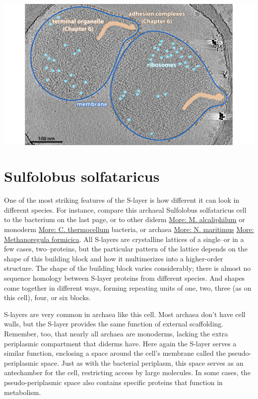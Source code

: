 \documentclass[]{tufte-book}
\begin{document}
\includegraphics{img/02_static/2_1_Mgenitalium}

\section{Sulfolobus solfataricus}\label{sulfolobus-solfataricus}

One of the most striking features of the S-layer is how different it can
look in different species. For instance, compare this archaeal
Sulfolobus solfataricus cell to the bacterium on the last page, or to
other diderm \protect\hyperlink{M._alcaliphilum}{More: M. alcaliphilum}
or monoderm \protect\hyperlink{}{More: C. thermocellum} bacteria, or
archaea \protect\hyperlink{N._maritimus}{More: N. maritimus}
\protect\hyperlink{Methanoregula_formicica}{More: Methanoregula
formicica}. All S-layers are crystalline lattices of a single--or in a
few cases, two--proteins, but the particular pattern of the lattice
depends on the shape of this building block and how it multimerizes into
a higher-order structure. The shape of the building block varies
considerably; there is almost no sequence homology between S-layer
proteins from different species. And shapes come together in different
ways, forming repeating units of one, two, three (as on this cell),
four, or six blocks.

S-layers are very common in archaea like this cell. Most archaea don't
have cell walls, but the S-layer provides the same function of external
scaffolding. Remember, too, that nearly all archaea are monoderms,
lacking the extra periplasmic compartment that diderms have. Here again
the S-layer serves a similar function, enclosing a space around the
cell's membrane called the pseudo-periplasmic space. Just as with the
bacterial periplasm, this space serves as an antechamber for the cell,
restricting access by large molecules. In some cases, the
pseudo-periplasmic space also contains specific proteins that function
in metabolism.
\end{document}
